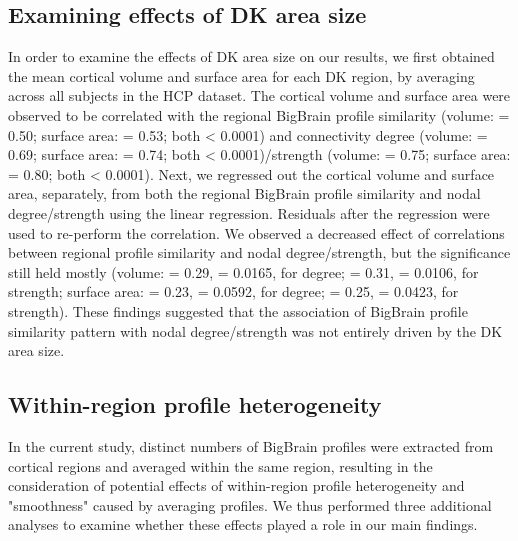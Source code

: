 \begin{refsection}
\subsection*{Examining effects of DK area size}
In order to examine the effects of DK area size on our results, we first obtained the mean cortical volume and surface area for each DK region, by averaging across all subjects in the HCP dataset. The cortical volume and surface area were observed to be correlated with the regional BigBrain profile similarity (volume: \rval = 0.50; surface area: \rval = 0.53; both \pval < 0.0001) and connectivity degree (volume: \rval = 0.69; surface area: \rval = 0.74; both \pval < 0.0001)/strength (volume: \rval = 0.75; surface area: \rval = 0.80; both \pval < 0.0001). Next, we regressed out the cortical volume and surface area, separately, from both the regional BigBrain profile similarity and nodal degree/strength using the linear regression. Residuals after the regression were used to re-perform the correlation. We observed a decreased effect of correlations between regional profile similarity and nodal degree/strength, but the significance still held mostly (volume: \rval = 0.29, \pval = 0.0165, for degree; \rval = 0.31, \pval = 0.0106, for strength; surface area: \rval = 0.23, \pval = 0.0592, for degree; \rval = 0.25, \pval = 0.0423, for strength). These findings suggested that the association of BigBrain profile similarity pattern with nodal degree/strength was not entirely driven by the DK area size.

\subsection*{Within-region profile heterogeneity}
In the current study, distinct numbers of BigBrain profiles were extracted from cortical regions and averaged within the same region, resulting in the consideration of potential effects of within-region profile heterogeneity and "smoothness" caused by averaging profiles. We thus performed three additional analyses to examine whether these effects played a role in our main findings.


\end{refsection}
